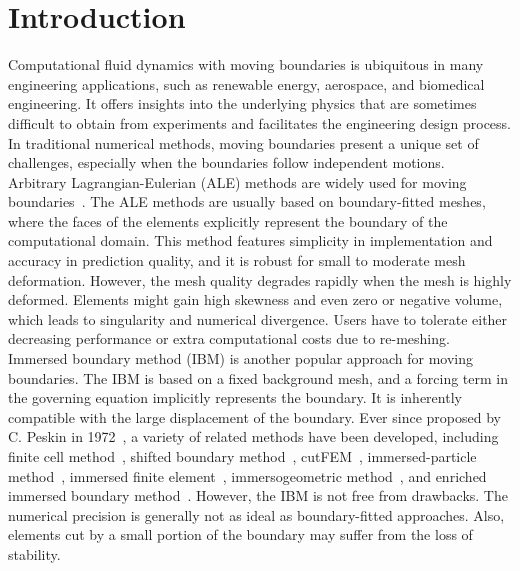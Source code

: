 \documentclass[preprint,12pt,sort&compress]{elsarticle}
\theoremstyle{definition}%
\begin{document}
\section{Introduction}
Computational fluid dynamics with moving boundaries is ubiquitous in many engineering applications, such as renewable energy, aerospace, and biomedical engineering.
It offers insights into the underlying physics that are sometimes difficult to obtain from experiments and facilitates the engineering design process.
In traditional numerical methods, moving boundaries present a unique set of challenges, especially when the boundaries follow independent motions.\\
Arbitrary Lagrangian-Eulerian (ALE) methods are widely used for moving boundaries~\cite{tezduyar2004finite, Masud4, Tezduyar92a, Tezduyar08a}. 
The ALE methods are usually based on boundary-fitted meshes, where the faces of the elements explicitly represent the boundary of the computational domain.
This method features simplicity in implementation and accuracy in prediction quality, and it is robust for small to moderate mesh deformation. 
However, the mesh quality degrades rapidly when the mesh is highly deformed.
Elements might gain high skewness and even zero or negative volume, which leads to singularity and numerical divergence.
Users have to tolerate either decreasing performance or extra computational costs due to re-meshing.\\
Immersed boundary method (IBM) is another popular approach for moving boundaries.
The IBM is based on a fixed background mesh, and a forcing term in the governing equation implicitly represents the boundary.
It is inherently compatible with the large displacement of the boundary.
Ever since proposed by C. Peskin in 1972~\cite{Peskin72}, a variety of related methods have been developed, including finite cell method~\cite{Parvizian2007,duster2008finite,xu2016fcm}, 
shifted boundary method~\cite{main2018shifteda,main2018shiftedb,song2018shifted,li2020shifted,colomes2021weighted}, 
cutFEM~\cite{hansbo2002unfitted}, {immersed-particle method}~\cite{Bazilevs2017a,Bazilevs2017b,behzadinasab2021coupling,moutsanidis2020treatment,moutsanidis2018hyperbolic}, 
immersed finite element~\cite{IFEM1,IFEM2,IFEM3,IFEM4,IFEM5,IFEM6}, 
immersogeometric method~\cite{schillinger2012isogeometric, Hsu15fb,Kamensky15ch,zhu2020immersogeometric},
and enriched immersed boundary method~\cite{zhao2022enriched}.
However, the IBM is not free from drawbacks.
The numerical precision is generally not as ideal as boundary-fitted approaches.
Also, elements cut by a small portion of the boundary may suffer from the loss of stability.\\
\end{document}
